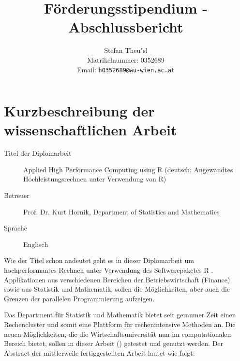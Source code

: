 \documentclass[a4paper,fleqn]{article}
\def\email#1{{\tt#1}}
\begin{document}
\title{F\"orderungsstipendium - Abschlussbericht}

\author{Stefan Theu"sl \\ Matrikelnummer: 0352689 \\ Email: \email{h0352689@wu-wien.ac.at}}

\maketitle              %

\section{Kurzbeschreibung der wissenschaftlichen Arbeit}

\begin{description}
\item[Titel der Diplomarbeit] Applied High Performance Computing using
  R (deutsch: Angewandtes Hochleistungsrechnen unter Verwendung von R)
\item[Betreuer] Prof. Dr. Kurt Hornik, Department of Statistics and
  Mathematics
\item[Sprache] Englisch

\end{description}

Wie der Titel schon andeutet geht es in dieser Diplomarbeit um
hochperformantes Rechnen unter Verwendung des Softwarepaketes
R \cite{Rcore}. Applikationen aus verschiedenen Bereichen der
Betriebswirtschaft (Finance) sowie aus Statistik und Mathematik,
sollen die M\"oglichkeiten, aber auch die Grenzen der parallelen
Programmierung aufzeigen.

Das Department f\"ur Statistik und
Mathematik bietet seit geraumer Zeit einen Rechencluster und somit
eine Plattform f\"ur rechenintensive Methoden an. Die neuen
M\"oglichkeiten, die die Wirtschaftsuniversit\"at nun im
computationalen Bereich bietet, sollen in dieser Arbeit
(\cite{theussl07}) 
getestet und
genutzt werden. Der Abstract der mittlerweile fertiggestellten Arbeit
lautet wie folgt:
\end{document}
